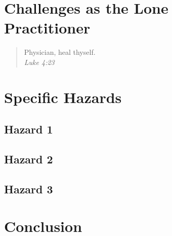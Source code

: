 \documentclass[12pt,a4paper]{article}
\begin{document}
\section{Challenges as the Lone Practitioner}

\begin{quote}
Physician, heal thyself. \\
\em Luke 4:23
\end{quote}

\section{Specific Hazards}

\subsection{Hazard 1}

\subsection{Hazard 2}

\subsection{Hazard 3}

\section{Conclusion}



\end{document}
